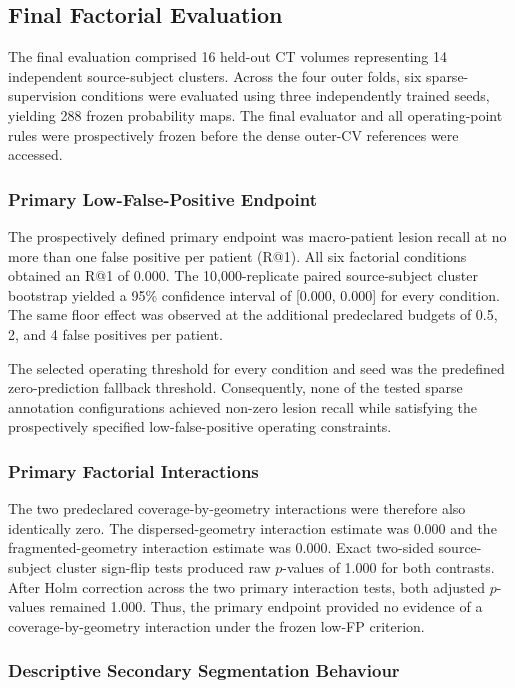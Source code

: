 \subsection{Final Factorial Evaluation}

The final evaluation comprised 16 held-out CT volumes representing 14 independent
source-subject clusters. Across the four outer folds, six sparse-supervision
conditions were evaluated using three independently trained seeds, yielding 288
frozen probability maps. The final evaluator and all operating-point rules were
prospectively frozen before the dense outer-CV references were accessed.

\subsubsection{Primary Low-False-Positive Endpoint}

The prospectively defined primary endpoint was macro-patient lesion recall at
no more than one false positive per patient (R@1). All six factorial conditions
obtained an R@1 of 0.000. The 10,000-replicate paired source-subject cluster
bootstrap yielded a 95\% confidence interval of [0.000, 0.000] for every
condition. The same floor effect was observed at the additional predeclared
budgets of 0.5, 2, and 4 false positives per patient.

The selected operating threshold for every condition and seed was the predefined
zero-prediction fallback threshold. Consequently, none of the tested sparse
annotation configurations achieved non-zero lesion recall while satisfying the
prospectively specified low-false-positive operating constraints.

\subsubsection{Primary Factorial Interactions}

The two predeclared coverage-by-geometry interactions were therefore also
identically zero. The dispersed-geometry interaction estimate was 0.000 and the
fragmented-geometry interaction estimate was 0.000. Exact two-sided
source-subject cluster sign-flip tests produced raw $p$-values of 1.000 for both
contrasts. After Holm correction across the two primary interaction tests, both
adjusted $p$-values remained 1.000. Thus, the primary endpoint provided no
evidence of a coverage-by-geometry interaction under the frozen low-FP criterion.

\subsubsection{Descriptive Secondary Segmentation Behaviour}

